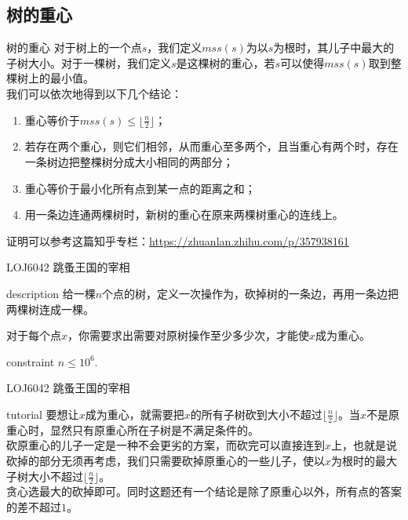 \documentclass{beamer}
\begin{document}
\subsection{树的重心}
\begin{frame}{树的重心}
	对于树上的一个点$s$，我们定义$mss(s)$为以$s$为根时，其儿子中最大的子树大小。对于一棵树，我们定义$s$是这棵树的重心，若$s$可以使得$mss(s)$取到整棵树上的最小值。\\
	
	我们可以依次地得到以下几个结论：
	\begin{enumerate}
		\item 重心等价于$mss(s) \le \lfloor\frac{n}{2}\rfloor$；
		\item 若存在两个重心，则它们相邻，从而重心至多两个，且当重心有两个时，存在一条树边把整棵树分成大小相同的两部分；
		\item 重心等价于最小化所有点到某一点的距离之和；
		\item 用一条边连通两棵树时，新树的重心在原来两棵树重心的连线上。
		
	\end{enumerate}
	{\tiny \color{gray} 证明可以参考这篇知乎专栏：\url{https://zhuanlan.zhihu.com/p/357938161}}
\end{frame}

\begin{frame}{LOJ6042 跳蚤王国的宰相}
	\begin{block}{description}
		给一棵$n$个点的树，定义一次操作为，砍掉树的一条边，再用一条边把两棵树连成一棵。
		
		对于每个点$x$，你需要求出需要对原树操作至少多少次，才能使$x$成为重心。
	\end{block}
	\begin{block}{constraint}
		$n \le 10^6.$
	\end{block}
\end{frame}
\begin{frame}{LOJ6042 跳蚤王国的宰相}
	\begin{block}{tutorial}
		要想让$x$成为重心，就需要把$x$的所有子树砍到大小不超过$\lfloor\frac{n}{2}\rfloor$。当$x$不是原重心时，显然只有原重心所在子树是不满足条件的。\\
		
		砍原重心的儿子一定是一种不会更劣的方案，而砍完可以直接连到$x$上，也就是说砍掉的部分无须再考虑，我们只需要砍掉原重心的一些儿子，使以$x$为根时的最大子树大小不超过$\lfloor\frac{n}{2}\rfloor$。\\
		
		贪心选最大的砍掉即可。同时这题还有一个结论是除了原重心以外，所有点的答案的差不超过$1$。
	\end{block}
\end{frame}
\end{document}
